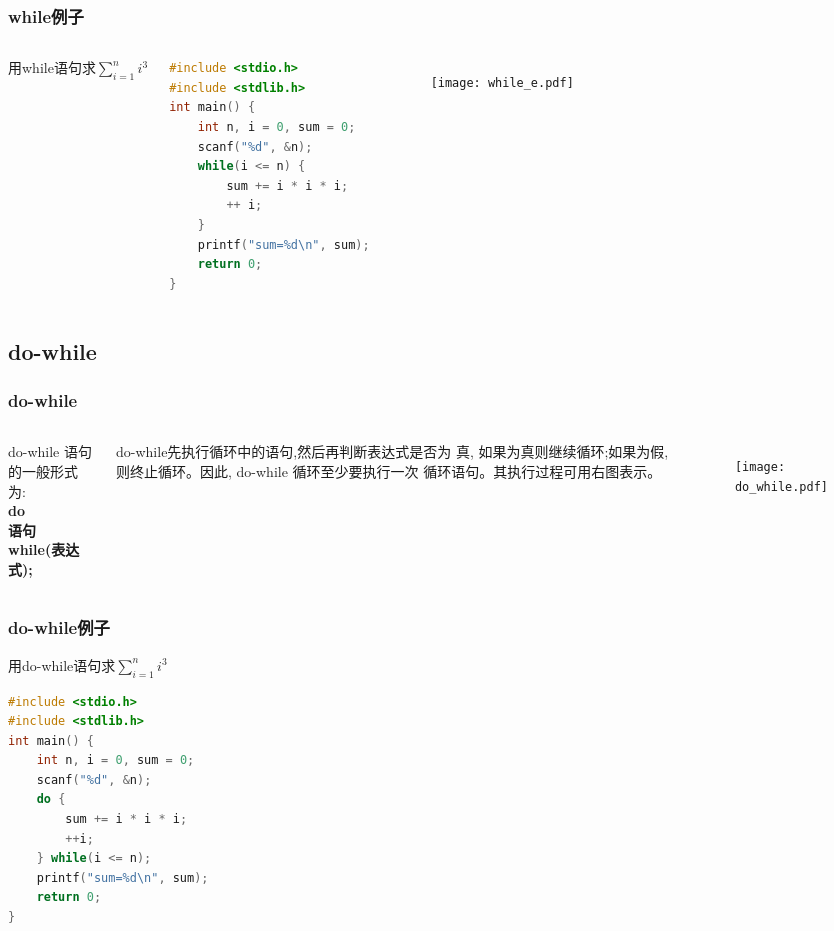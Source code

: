 \documentclass[cjk,slidestop,mathserif,hyperref={CJKbookmarks=true}]{beamer}
\begin{document}
\begin{CJK*}{UTF8}{gkai}
\begin{frame}[fragile]
\begin{columns}
    \end{columns}
\end{frame}


\begin{frame}[fragile]
    \frametitle{while例子}
    \begin{columns}
    \column{6cm}
    用while语句求$\sum\limits_{i=1}^{n}i^3$
    \begin{lstlisting}[language=c]
#include <stdio.h>
#include <stdlib.h>
int main() {
    int n, i = 0, sum = 0;
    scanf("%d", &n);
    while(i <= n) {
        sum += i * i * i;
        ++ i;
    }
    printf("sum=%d\n", sum);
    return 0;
}
    \end{lstlisting}
    \column{5cm}
        \begin{figure}
            \texttt{[image: while\_e.pdf]}
        \end{figure}
    \end{columns}
\end{frame}

\subsection{do-while}
\begin{frame}[fragile]
    \frametitle{do-while}

    \begin{columns}
        \column{6cm}
        \begin{definition}
            do-while 语句的一般形式为: \\
            \textbf{\quad do \\
                \qquad 语句 \\
                \quad while(表达式);}
        \end{definition}
do-while先执行循环中的语句,然后再判断表达式是否为
真, 如果为真则继续循环;如果为假, 则终止循环。因此, do-while 循环至少要执行一次
循环语句。其执行过程可用右图表示。
        \column{5cm}
            \begin{figure}[!t]
                \texttt{[image: do\_while.pdf]}
            \end{figure}
    \end{columns}
\end{frame}

\begin{frame}[fragile]
    \frametitle{do-while例子}

    用do-while语句求$\sum\limits_{i=1}^{n}i^3$
    \begin{lstlisting}[language=c]
#include <stdio.h>
#include <stdlib.h>
int main() {
    int n, i = 0, sum = 0;
    scanf("%d", &n);
    do {
        sum += i * i * i;
        ++i;
    } while(i <= n);
    printf("sum=%d\n", sum);
    return 0;
}
    \end{lstlisting}
\end{frame}


\end{CJK*}
\end{document}
